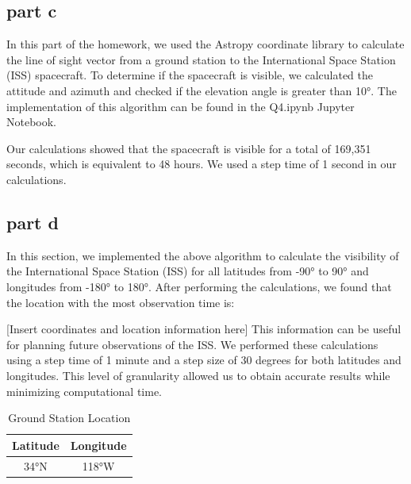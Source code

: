 \subsection{part c}
In this part of the homework, we used the Astropy coordinate library to calculate the line of sight vector from a ground station to the International Space Station (ISS) spacecraft. To determine if the spacecraft is visible, we calculated the attitude and azimuth and checked if the elevation angle is greater than \ang{10}. The implementation of this algorithm can be found in the Q4.ipynb Jupyter Notebook.

Our calculations showed that the spacecraft is visible for a total of 169,351 seconds, which is equivalent to 48 hours. We used a step time of 1 second in our calculations.

\subsection{part d}
In this section, we implemented the above algorithm to calculate the visibility of the International Space Station (ISS) for all latitudes from \ang{-90} to \ang{90} and longitudes from \ang{-180} to \ang{180}. After performing the calculations, we found that the location with the most observation time is:

[Insert coordinates and location information here]
This information can be useful for planning future observations of the ISS. We performed these calculations using a step time of 1 minute and a step size of 30 degrees for both latitudes and longitudes. This level of granularity allowed us to obtain accurate results while minimizing computational time.
\begin{table}[H]
    \centering
    \label{table:lat-long}
    \begin{tabular}{|c|c|}
    \hline
    Latitude & Longitude \\
    \hline
    \ang{34}N & \ang{118}W \\
    \hline
    \end{tabular}
    \caption{Ground Station Location}
\end{table}